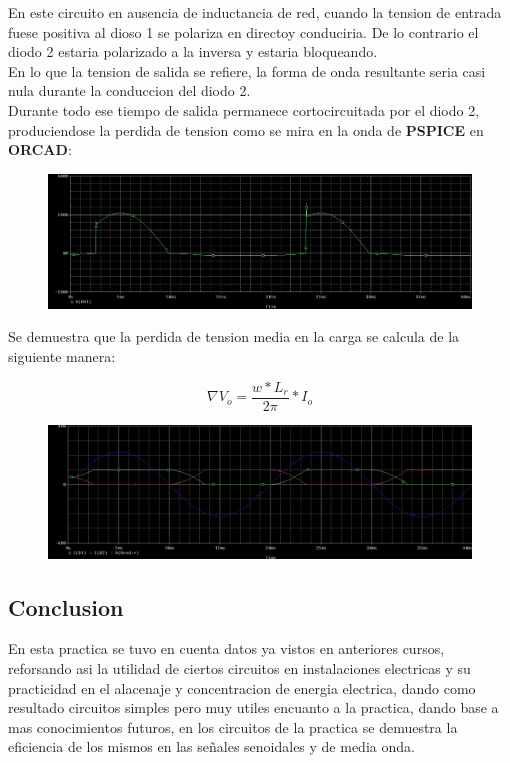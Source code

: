\documentclass[11pt,a4paper]{article}
\begin{document}
En este circuito en ausencia de inductancia de red, cuando la tension de entrada fuese positiva al dioso 1 se polariza en directoy conduciria. De lo contrario el diodo 2 estaria polarizado a la inversa y estaria bloqueando.\\
En lo que la tension de salida se refiere, la forma de onda resultante seria casi nula durante la conduccion del diodo 2.\\
Durante todo ese tiempo de salida permanece cortocircuitada por el diodo 2, produciendose la perdida de tension como se mira en la onda de \textbf{PSPICE} en \textbf{ORCAD}:

\begin{figure}[h]
\centering
\includegraphics[scale=.3]{15.png} 
\end{figure}

Se demuestra que la perdida de tension media en la carga se calcula de la siguiente manera:

$$ \nabla V_{o} = \dfrac{w*L_{r}}{2\pi} * I_{o} $$

\begin{figure}[h]
\centering
\includegraphics[scale=.3]{16.png} 
\end{figure}

\begin{center}
\section{Conclusion}
En esta practica se tuvo en cuenta datos ya vistos en anteriores cursos, reforsando asi la utilidad de ciertos circuitos en instalaciones electricas y su practicidad en el alacenaje y concentracion de energia electrica, dando como resultado circuitos simples pero muy utiles encuanto a la practica, dando base a mas conocimientos futuros, en los circuitos de la practica se demuestra la eficiencia de los mismos en las señales senoidales y de media onda. 
\end{center}
\end{document}
